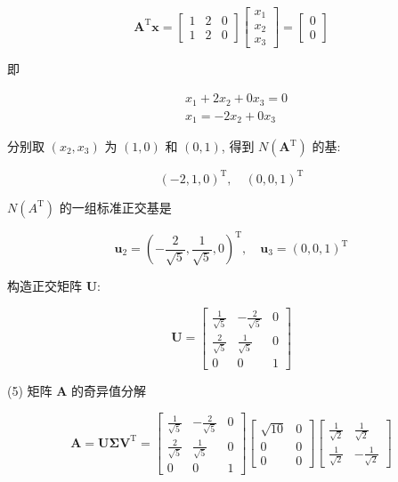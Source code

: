 \documentclass[10pt]{article}
\begin{document}
$$
\boldsymbol{A}^{\mathrm{T}} \boldsymbol{x}=\left[\begin{array}{lll}
1 & 2 & 0 \\
1 & 2 & 0
\end{array}\right]\left[\begin{array}{l}
x_{1} \\
x_{2} \\
x_{3}
\end{array}\right]=\left[\begin{array}{l}
0 \\
0
\end{array}\right]
$$

即

$$
\begin{aligned}
& x_{1}+2 x_{2}+0 x_{3}=0 \\
& x_{1}=-2 x_{2}+0 x_{3}
\end{aligned}
$$

分别取 $\left(x_{2}, x_{3}\right)$ 为 $(1,0)$ 和 $(0,1)$, 得到 $N\left(\boldsymbol{A}^{\mathrm{T}}\right)$ 的基:

$$
(-2,1,0)^{\mathrm{T}}, \quad(0,0,1)^{\mathrm{T}}
$$

$N\left(A^{\mathrm{T}}\right)$ 的一组标准正交基是

$$
\boldsymbol{u}_{2}=\left(-\frac{2}{\sqrt{5}}, \frac{1}{\sqrt{5}}, 0\right)^{\mathrm{T}}, \quad \boldsymbol{u}_{3}=(0,0,1)^{\mathrm{T}}
$$

构造正交矩阵 $\boldsymbol{U}:$

$$
\boldsymbol{U}=\left[\begin{array}{ccc}
\frac{1}{\sqrt{5}} & -\frac{2}{\sqrt{5}} & 0 \\
\frac{2}{\sqrt{5}} & \frac{1}{\sqrt{5}} & 0 \\
0 & 0 & 1
\end{array}\right]
$$

(5) 矩阵 $\boldsymbol{A}$ 的奇异值分解

$$
\boldsymbol{A}=\boldsymbol{U} \boldsymbol{\Sigma} \boldsymbol{V}^{\mathrm{T}}=\left[\begin{array}{ccc}
\frac{1}{\sqrt{5}} & -\frac{2}{\sqrt{5}} & 0 \\
\frac{2}{\sqrt{5}} & \frac{1}{\sqrt{5}} & 0 \\
0 & 0 & 1
\end{array}\right]\left[\begin{array}{cc}
\sqrt{10} & 0 \\
0 & 0 \\
0 & 0
\end{array}\right]\left[\begin{array}{cc}
\frac{1}{\sqrt{2}} & \frac{1}{\sqrt{2}} \\
\frac{1}{\sqrt{2}} & -\frac{1}{\sqrt{2}}
\end{array}\right]
$$
\end{document}
